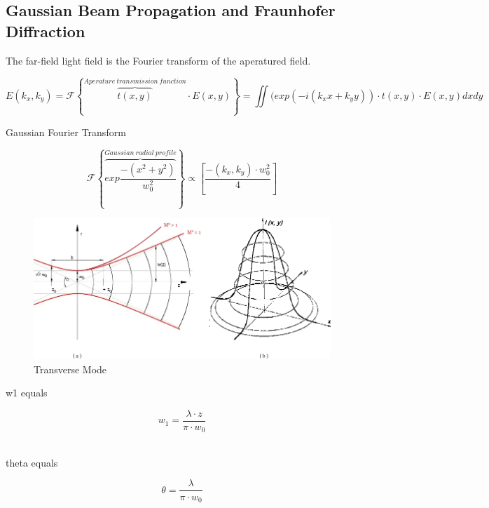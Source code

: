 \subsection{Gaussian Beam Propagation and Fraunhofer Diffraction}
	\label{diffraction}
	
The far-field light field is the Fourier transform of the aperatured field.
	
\begin{equation} 
E(k_{x},k_{y}) = \mathcal{F}\left\{{\overbrace{t(x,y)}^{Aperature\  transmission\  function}\cdot E(x,y)}\right\} = \iint(exp(-i(k_{x} x + k_{y}y))\cdot t(x,y)\cdot E(x,y)dxdy 
\end{equation} 

Gaussian Fourier Transform

\begin{equation} 
\mathcal{F}\left\{{\overbrace{exp \frac{-(x^{2} + y^{2})}{w^{2}_{0}}}^{Gaussian\ radial\ profile}} \right\} \propto\left[\frac{-(k_{x},k_{y})\cdot w^{2}_{0}}{4}\right]
\end{equation}

\begin{figure} [ht]
\centering
\includegraphics[scale=0.5]{chapters/img/TEM00.jpg}	
\caption{Transverse Mode}
\label{laser_power}
\end{figure}

w1 equals

\begin{equation}
w_{1} = \frac{\lambda \cdot z}{\pi\cdot w_{0}}
\end{equation}
\

theta equals

\begin{equation}
\theta = \frac{\lambda}{\pi\cdot w_{0}}
\end{equation}
\

